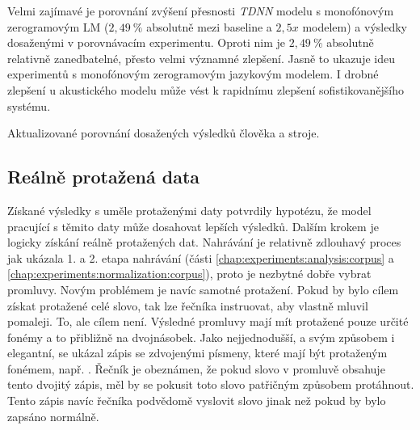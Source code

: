 Velmi zajímavé je porovnání zvýšení přesnosti \textit{TDNN} modelu s monofónovým zerogramovým LM ($2,49\ \%$ absolutně mezi baseline a $2,5x$ modelem) a výsledky dosaženými v porovnávacím experimentu. Oproti nim je $2,49\ \%$ absolutně relativně zanedbatelné, přesto velmi významné zlepšení. Jasně to ukazuje ideu experimentů s monofónovým zerogramovým jazykovým modelem. I drobné zlepšení u akustického modelu může vést k rapidnímu zlepšení sofistikovanějšího systému.

\begin{table}[htpb]
  \centering
  \def\arraystretch{1.5}
  \caption{Aktualizované porovnání dosažených výsledků člověka a stroje.}
  \label{tab:experiments:augmentation:comparison}
\end{table}


\subsection{Reálně protažená data}
\label{chap:experiments:augmentation:real}

Získané výsledky s uměle protaženými daty potvrdily hypotézu, že model pracující s těmito daty může dosahovat lepších výsledků. Dalším krokem je logicky získání reálně protažených dat. Nahrávání je relativně zdlouhavý proces jak ukázala 1. a 2. etapa nahrávání (části \ref{chap:experiments:analysis:corpus} a \ref{chap:experiments:normalization:corpus}), proto je nezbytné dobře vybrat promluvy. Novým problémem je navíc samotné protažení. Pokud by bylo cílem získat protažené celé slovo, tak lze řečníka instruovat, aby vlastně mluvil pomaleji. To, ale cílem není. Výsledné promluvy mají mít protažené pouze určité fonémy a to přibližně na dvojnásobek. Jako nejjednodušší, a svým způsobem i elegantní, se ukázal zápis se zdvojenými písmeny, které mají být protaženým fonémem, např. . Řečník je obeznámen, že pokud slovo v promluvě obsahuje tento dvojitý zápis, měl by se pokusit toto slovo patřičným způsobem protáhnout. Tento zápis navíc řečníka podvědomě  vyslovit slovo jinak než pokud by bylo zapsáno normálně.

